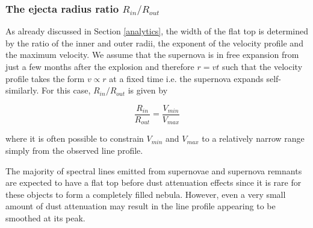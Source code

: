 \documentclass[useAMS,usenatbib,usegraphicx]{mnras}
\begin{document}
\subsubsection{The ejecta radius ratio $R_{in}/R_{out}$}

As already discussed in Section \ref{analytics}, the width of the flat top 
is determined by the ratio of the inner and outer radii, the 
exponent of the velocity profile and the maximum velocity.  We 
assume that the supernova is in free expansion from 
just a few months after the explosion and therefore $r=vt$ such that the velocity profile takes the form $v \propto r$ at a fixed time  i.e. the supernova expands self-similarly.  For this case, $R_{in}/R_{out}$ is given by

\begin{equation}
\frac{R_{in}}{R_{out}}=\frac{V_{min}}{V_{max}}
\end{equation}

\noindent where it is often possible to constrain $V_{min}$ and $V_{max}$ 
to a relatively narrow range simply from the observed line profile.

The majority of spectral lines emitted from supernovae and supernova 
remnants are expected to have a flat top before dust attenuation effects since it is rare for these 
objects to form a completely filled nebula.  However, even a very small amount of 
dust attenuation may result in the line profile appearing to be smoothed at its 
peak.
\end{document}

